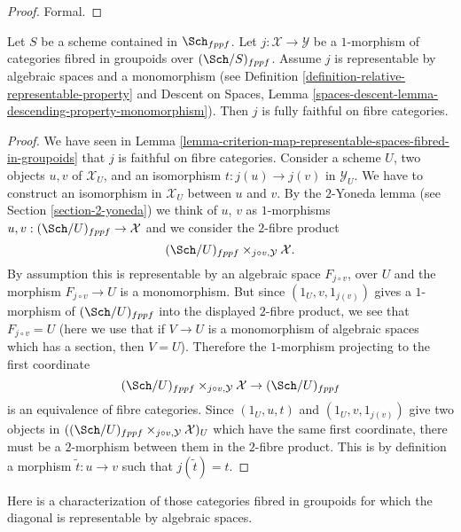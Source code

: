 \begin{proof}
Formal.
\end{proof}

\begin{lemma}
\label{lemma-open-fibred-category-is-full}
Let $S$ be a scheme contained in $\Sch_{fppf}$.
Let $j : \mathcal X \to \mathcal Y$ be a $1$-morphism of
categories fibred in groupoids over $(\Sch/S)_{fppf}$.
Assume $j$ is representable by algebraic spaces and a monomorphism
(see
Definition \ref{definition-relative-representable-property}
and
Descent on Spaces, Lemma
\ref{spaces-descent-lemma-descending-property-monomorphism}).
Then $j$ is fully faithful on fibre categories.
\end{lemma}

\begin{proof}
We have seen in
Lemma \ref{lemma-criterion-map-representable-spaces-fibred-in-groupoids}
that $j$ is faithful on fibre categories. Consider a scheme $U$,
two objects $u, v$ of $\mathcal{X}_U$, and an isomorphism
$t : j(u) \to j(v)$ in $\mathcal{Y}_U$. We have to construct an
isomorphism in $\mathcal{X}_U$ between $u$ and $v$.
By the $2$-Yoneda lemma (see Section \ref{section-2-yoneda})
we think of $u$, $v$ as $1$-morphisms
$u, v : (\Sch/U)_{fppf} \to \mathcal{X}$
and we consider the $2$-fibre product
$$
(\Sch/U)_{fppf} \times_{j \circ v, \mathcal{Y}} \mathcal{X}.
$$
By assumption this is representable by an algebraic space
$F_{j \circ v}$, over $U$ and the morphism
$F_{j \circ v} \to U$ is a monomorphism.
But since $(1_U, v, 1_{j(v)})$ gives a $1$-morphism of
$(\Sch/U)_{fppf}$ into the displayed $2$-fibre product,
we see that $F_{j \circ v} = U$ (here we use
that if $V \to U$ is a monomorphism of algebraic spaces which has a
section, then $V = U$). Therefore the $1$-morphism projecting to
the first coordinate
$$
(\Sch/U)_{fppf} \times_{j \circ v, \mathcal{Y}} \mathcal{X}
\to (\Sch/U)_{fppf}
$$
is an equivalence of fibre categories.
Since $(1_U, u, t)$ and $(1_U, v, 1_{j(v)})$ give two
objects in $((\Sch/U)_{fppf} \times_{j \circ v, \mathcal{Y}}
\mathcal{X})_U$ which have the same first coordinate, there must
be a $2$-morphism between them in the $2$-fibre product.
This is by definition a morphism $\tilde t : u \to v$ such that
$j(\tilde t) = t$.
\end{proof}

\noindent
Here is a characterization of those categories fibred in groupoids
for which the diagonal is representable by algebraic spaces.

